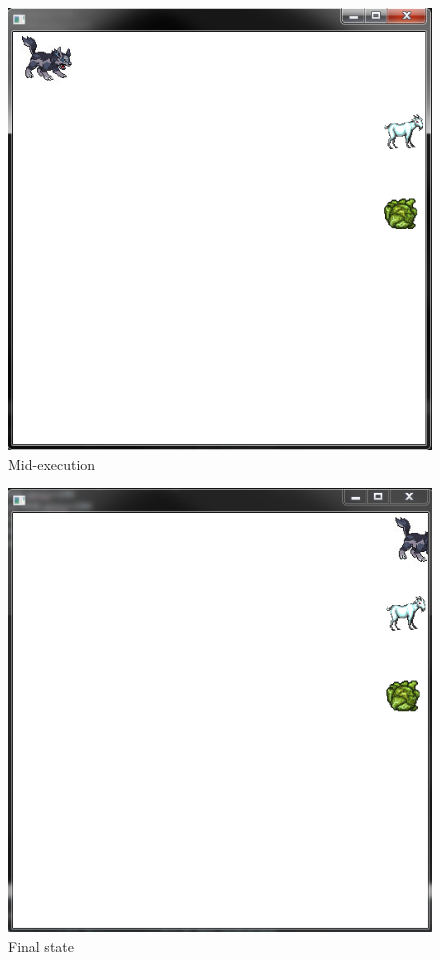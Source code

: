 \documentclass[11pt,a4paper]{article}
\begin{document}
\begin{figure}[ht!]
	\centering
		\includegraphics[width=\textwidth]{2}
	\caption{Mid-execution}
\end{figure}

\begin{figure}[ht!]
	\centering
		\includegraphics[width=\textwidth]{3}
	\caption{Final state}
\end{figure}

\clearpage




\nocite{*}
\end{document}
